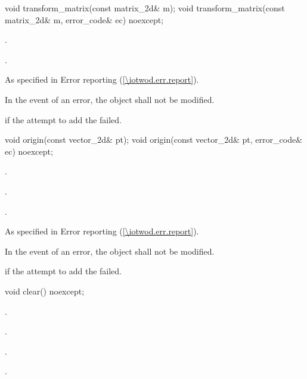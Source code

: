 \begin{itemdecl}
    void transform_matrix(const matrix_2d& m);
    void transform_matrix(const matrix_2d& m, error_code& ec) noexcept;
\end{itemdecl}
\begin{itemdescr}
	\pnum
	\effects
	.
	
	\pnum
	.
	
	\pnum
	\throws
	As specified in Error reporting (\ref{\iotwod.err.report}).

	\pnum
	\remarks
	In the event of an error, the object shall not be modified.

	\pnum
	\errors
	 if the attempt to add the  failed.
	
\end{itemdescr}

\begin{itemdecl}
    void origin(const vector_2d& pt);
    void origin(const vector_2d& pt, error_code& ec) noexcept;
\end{itemdecl}
\begin{itemdescr}
	\pnum
	\effects
	.
	
	\pnum
	.
	
	\pnum
	\postconditions
	.
	
	\pnum
	\throws
	As specified in Error reporting (\ref{\iotwod.err.report}).

	\pnum
	\remarks
	In the event of an error, the object shall not be modified.

	\pnum
	\errors
	 if the attempt to add the  failed.
	
\end{itemdescr}

\begin{itemdecl}
    void clear() noexcept;
\end{itemdecl}
\begin{itemdescr}
	\pnum
	\postconditions
	.
	
	\pnum
	.
	
	\pnum
	.
	
	\pnum
	.

\end{itemdescr}


